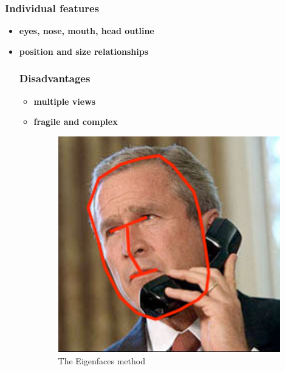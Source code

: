 \documentclass[a4paper,12pt]{report}
\begin{document}
			\subsubsection{Individual features}
			
			\begin{itemize}
				\item \textbf{eyes, nose, mouth, head outline}
				\item \textbf{position and size relationships}
				
			\subsubsection{Disadvantages}
			
			\begin{itemize}
				\item \textbf{multiple views} 
				\item \textbf{fragile and complex}
			\begin{figure}[h]
				\centering
				\caption{\label{face recognation} The Eigenfaces method\cite{haar_lbp_hog_comp_pdf}}
				\includegraphics[scale=0.55]{capture0.png}
			\end{figure}
		
		

\end{itemize}
\end{itemize}
\end{document}
